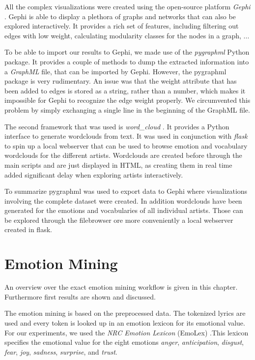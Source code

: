 \documentclass[10pt,a4paper]{article}
\begin{document}
	All the complex visualizations were created using the open-source platform \textit{Gephi} \cite{ICWSM09154}. Gephi is able to display a plethora of graphs and networks that can also be explored interactively. It provides a rich set of features, including filtering out edges with low weight, calculating modularity classes for the nodes in a graph, ... 
	
	To be able to import our results to Gephi, we made use of the \textit{pygraphml} Python package. It provides a couple of methods to dump the extracted information into a \textit{GraphML} file, that can be imported by Gephi. However, the pygraphml package is very rudimentary. An issue was that the weight attribute that has been added to edges is stored as a string, rather than a number, which makes it impossible for Gephi to recognize the edge weight properly. We circumvented this problem by simply exchanging a single line in the beginning of the GraphML file.
	
	The second framework that was used is \textit{word\_cloud} \cite{wordcloud}. It provides a Python interface to generate wordclouds from text. It was used in conjunction with \textit{flask} \cite{flask} to spin up a local webserver that can be used to browse emotion and vocabulary wordclouds for the different artists. Wordclouds are created before through the main scripts and are just displayed in HTML, as creating them in real time added significant delay when exploring artists interactively.
	
	To summarize pygraphml was used to export data to Gephi where visualizations involving the complete dataset were created. In addition wordclouds have been generated for the emotions and vocabularies of all individual artists. Those can be explored through the filebrowser ore more conveniently a local webserver created in flask.
	
	\section{Emotion Mining}
	\label{sec:emotionmining}
	An overview over the exact emotion mining workflow is given in this chapter. Furthermore first results are shown and discussed.
	
	The emotion mining is based on the preprocessed data. The tokenized lyrics are used and every token is looked up in an emotion lexicon for its emotional value. For our experiments, we used the \textit{NRC Emotion Lexicon} (EmoLex) \cite{emolex}.This lexicon specifies the emotional value for the eight emotions \textit{anger}, \textit{anticipation}, \textit{disgust}, \textit{fear}, \textit{joy}, \textit{sadness}, \textit{surprise}, and \textit{trust}.
	
\end{document}
